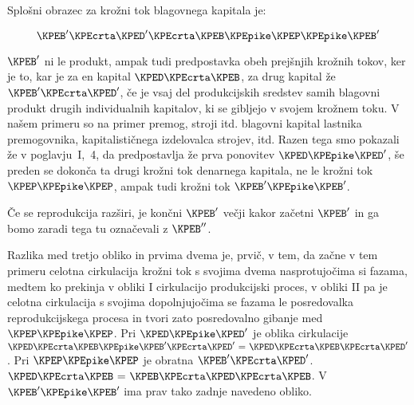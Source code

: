 \documentclass[kapital_02.tex]{subfiles}
\begin{document}
Splošni \KPEstran obrazec za krožni tok blagovnega kapitala je:

\[
    \KPEB'
    \KPEcrta
    \KPED'
    \KPEcrta
    \KPEB
    \KPEpike
    \KPEP
    \KPEpike
    \KPEB'
\]

\( \KPEB' \) ni le produkt, ampak tudi predpostavka obeh prejšnjih krožnih tokov, ker je to, kar je za en kapital \( \KPED \KPEcrta \KPEB \), za drug kapital že \( \KPEB' \KPEcrta \KPED' \), če je vsaj del produkcijskih sredstev samih blagovni produkt drugih individualnih kapitalov, ki se gibljejo v svojem krožnem toku. V našem primeru so na primer premog, stroji itd. blagovni kapital lastnika premogovnika, kapitalističnega izdelovalca strojev, itd. Razen tega smo pokazali že v poglavju\ I,\ 4, da predpostavlja že prva ponovitev \( \KPED \KPEpike \KPED' \), še preden se dokonča ta drugi krožni tok denarnega kapitala, ne le krožni tok \( \KPEP \KPEpike \KPEP \), ampak tudi krožni tok \( \KPEB' \KPEpike \KPEB' \).

Če se reprodukcija razširi, je končni \( \KPEB' \) večji kakor začetni \( \KPEB' \) in ga bomo zaradi tega tu označevali z \( \KPEB'' \).

Razlika med tretjo obliko in prvima dvema je, prvič, v tem, da začne v tem primeru celotna cirkulacija krožni tok s svojima dvema nasprotujočima si fazama, medtem ko prekinja v obliki I cirkulacijo produkcijski proces, v obliki II pa je celotna cirkulacija s svojima dopolnjujočima se fazama le posredovalka reprodukcijskega procesa in tvori zato posredovalno gibanje med \( \KPEP \KPEpike \KPEP \). Pri \( \KPED \KPEpike \KPED' \) je oblika cirkulacije \( \KPED \KPEcrta \KPEB \KPEpike \KPEB' \KPEcrta \KPED' \textrm{ = } \KPED \KPEcrta \KPEB \KPEcrta \KPED' \). Pri \( \KPEP \KPEpike \KPEP \) je obratna \( \KPEB' \KPEcrta \KPED' \). \( \KPED \KPEcrta \KPEB \textrm{ = } \KPEB \KPEcrta \KPED \KPEcrta \KPEB \). V \( \KPEB' \KPEpike \KPEB' \) ima prav tako zadnje navedeno obliko.
\end{document}
